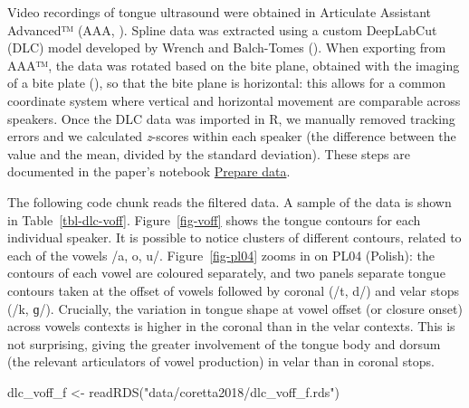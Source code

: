 \documentclass[
  man,
  longtable,
  nolmodern,
  notxfonts,
  notimes,
  colorlinks=true,linkcolor=blue,citecolor=blue,urlcolor=blue]{apa7}
\newenvironment{Shaded}{\begin{snugshade}}{\end{snugshade}}
\newcommand{\FunctionTok}[1]{\textcolor[rgb]{0.28,0.35,0.67}{#1}}
\newcommand{\NormalTok}[1]{\textcolor[rgb]{0.00,0.23,0.31}{#1}}
\newcommand{\OtherTok}[1]{\textcolor[rgb]{0.00,0.23,0.31}{#1}}
\newcommand{\StringTok}[1]{\textcolor[rgb]{0.13,0.47,0.30}{#1}}
\begin{document}
Video recordings of tongue ultrasound were obtained in Articulate
Assistant Advanced™ (AAA, ). Spline data was extracted using a custom DeepLabCut (DLC)
model developed by Wrench and Balch-Tomes
(). When exporting from AAA™, the data
was rotated based on the bite plane, obtained with the imaging of a bite
plate (), so that the
bite plane is horizontal: this allows for a common coordinate system
where vertical and horizontal movement are comparable across speakers.
Once the DLC data was imported in R, we manually removed tracking errors
and we calculated \emph{z}-scores within each speaker (the difference
between the value and the mean, divided by the standard deviation).
These steps are documented in the paper's notebook
\href{notebooks/01_prepare_data.qmd}{Prepare data}.

The following code chunk reads the filtered data. A sample of the data
is shown in Table~\ref{tbl-dlc-voff}. Figure~\ref{fig-voff} shows the
tongue contours for each individual speaker. It is possible to notice
clusters of different contours, related to each of the vowels /a, o, u/.
Figure~\ref{fig-pl04} zooms in on PL04 (Polish): the contours of each
vowel are coloured separately, and two panels separate tongue contours
taken at the offset of vowels followed by coronal (/t, d/) and velar
stops (/k, ɡ/). Crucially, the variation in tongue shape at vowel offset
(or closure onset) across vowels contexts is higher in the coronal than
in the velar contexts. This is not surprising, giving the greater
involvement of the tongue body and dorsum (the relevant articulators of
vowel production) in velar than in coronal stops.

\begin{Shaded}
\begin{Highlighting}[]
\NormalTok{dlc\_voff\_f }\OtherTok{\textless{}{-}} \FunctionTok{readRDS}\NormalTok{(}\StringTok{"data/coretta2018/dlc\_voff\_f.rds"}\NormalTok{)}
\end{Highlighting}
\end{Shaded}
\end{document}

